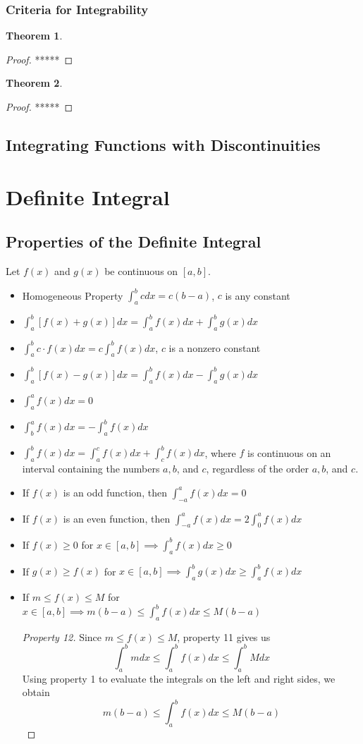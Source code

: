 \documentclass[10pt]{report}
\newtheorem{thm3}{Theorem}[subsection]
\begin{document}
\subsubsection{Criteria for Integrability}
\begin{thm3}
\end{thm3}
\begin{proof}
*****
\end{proof}
\begin{thm3}
\end{thm3}
\begin{proof}
*****
\end{proof}
\subsection{Integrating Functions with Discontinuities}
\section{Definite Integral}
\subsection{Properties of the Definite Integral}
Let $f(x)$ and $g(x)$ be continuous on $[a,b]$.
\begin{itemize}
\item[1.]Homogeneous Property $\int_a^b c dx=c(b-a)$, $c$ is any constant
\item[2.] $\int_a^b [f(x)+g(x)]dx =\int_a^b f(x)dx +\int_a^b g(x)dx $
\item[3.] $\int_a^b c\cdot f(x)dx=c\int_a^b f(x)dx$, $c$ is a nonzero constant
\item[4.] $\int_a^b [f(x)-g(x)]dx =\int_a^b f(x)dx -\int_a^b g(x)dx $
\item[5.] $\int_a^a f(x)dx=0$
\item[6.] $\int_b^a f(x)dx=-\int_a^b f(x)dx$
\item[7.] $\int_a^b f(x)dx=\int_a^c f(x)dx+\int_c^b f(x)dx$, where $f$ is continuous on an interval containing the numbers $a,b$, and $c$, regardless of the order $a,b$, and $c$.
\item[8.] If $f(x)$ is an odd function, then $\int_{-a}^a f(x)dx=0$
\item[9.] If $f(x)$ is an even function, then $\int_{-a}^a f(x)dx=2\int_0^a f(x)dx$
\item[10.] If $f(x)\geq 0$ for $x\in[a,b]\implies \int_a^b f(x)dx\geq 0$
\item[11.] If $g(x)\geq f(x)$ for $x\in[a,b]\implies \int_a^b g(x)dx\geq \int_a^b f(x)dx$
\item[12.] If $m\leq f(x)\leq M$ for $x\in[a,b]\implies m(b-a)\leq \int_a^b f(x)dx\leq M(b-a)$
\begin{proof}[Property 12]
Since $m\leq f(x)\leq M$, property 11 gives us
$$\int_a^b m dx\leq \int_a^b f(x) dx\leq \int_a^b M dx$$
Using property 1 to evaluate the integrals on the left and right sides, we obtain
$$m(b-a)\leq \int_a^b f(x) dx\leq M(b-a)$$
\end{proof}
\end{itemize}
\end{document}
